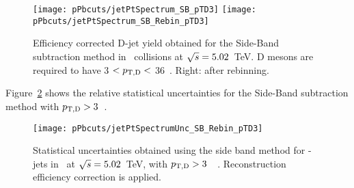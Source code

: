 \begin{figure}[bth]
\centering
\texttt{[image: pPbcuts/jetPtSpectrum\_SB\_pTD3]}
\texttt{[image: pPbcuts/jetPtSpectrum\_SB\_Rebin\_pTD3]}
\caption{Efficiency corrected D-jet yield obtained for the Side-Band subtraction method in \pp\ collisions at $\sqrt{s}=5.02$~TeV. D mesons are required to have 3 $< p_{\mathrm{T,D}}<$ 36~\GeVc. Right: after rebinning.}
\label{fig:eq_pPb_Directjet_corrSum}
\end{figure}


Figure~\ref{fig:JetPt_pPb_SBUnc_Dzero} shows the relative statistical uncertainties for the Side-Band subtraction method with $p_{\mathrm{T,D}}>3$~\GeVc. %

\begin{figure}[bth]
\centering
\texttt{[image: pPbcuts/jetPtSpectrumUnc\_SB\_Rebin\_pTD3]}
\caption{Statistical uncertainties obtained using the side band method for \Dzero-jets in \pp\ at $\sqrt{s}=5.02$~TeV, with $p_{\mathrm{T,D}}>3$~\GeVc\ . Reconstruction efficiency correction is applied.}
\label{fig:JetPt_pPb_SBUnc_Dzero}
\end{figure}


